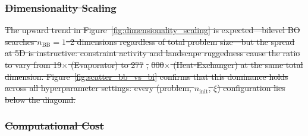 \documentclass[12pt,a4paper]{article}%
\theoremstyle{plain}%
\theoremstyle{remark}%
\theoremstyle{definition}%
\def\BB{\mathrm{BB}}
\providecommand{\DIFdeltex}[1]{{\protect\color{red}\sout{#1}}}                      %
\providecommand{\DIFdel}[1]{\texorpdfstring{\DIFdeltex{#1}}{}} %
\begin{document}
\subsubsection{\DIFdel{Dimensionality Scaling}}%
\addtocounter{subsubsection}{-1}%

\label{fig:dimensionality_scaling}%

\DIFdel{The upward trend in Figure~\ref{fig:dimensionality_scaling} is expected---bilevel BO searches $n_{\BB}=1$--2 dimensions regardless of total problem size---but the spread at 5D is instructive: constraint activity and landscape ruggedness cause the ratio to vary from 19$\times$ (Evaporator) to 277}%
\DIFdel{,}%
\DIFdel{000$\times$ (Heat-Exchanger) at the same total dimension. Figure~\ref{fig:scatter_bb_vs_bi} confirms that this dominance holds across all hyperparameter settings: every (problem, $n_\text{init}$, $\xi$) configuration lies below the diagonal. }%


\subsubsection{\DIFdel{Computational Cost}}%
\addtocounter{subsubsection}{-1}%
\end{document}
